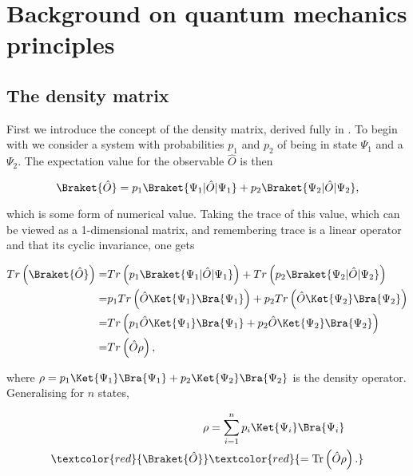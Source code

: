 \section{Background on quantum mechanics principles}
\subsection{The density matrix}
First we introduce  the concept of the density matrix,  derived fully in
\cite{quantum_course}.   To  begin  with   we  consider  a  system  with
probabilities  $p_1$  and  $p_2$  of  being  in  state  $\Psi_1$  and  a
$\Psi_2$. The expectation value for the observable $\hat{O}$ is then

\begin{equation}
  \Braket{\hat{O}} = p_1\Braket{\Psi_1|\hat{O}|\Psi_1} + p_2\Braket{\Psi_2|\hat{O}|\Psi_2},
\end{equation}

\noindent which  is some form  of numerical  value. Taking the  trace of
this  value,  which  can  be  viewed  as  a  1-dimensional  matrix,  and
remembering trace is  a linear operator and that  its cyclic invariance,
one gets

\begin{equation}
  \begin{aligned}
    Tr\left( \Braket{\hat{O}}\right)  = & Tr\left( p_1\Braket{\Psi_1|\hat{O}|\Psi_1}\right)  + Tr\left( p_2\Braket{\Psi_2|\hat{O}|\Psi_2}\right)  \\
    = & p_1Tr\left( \hat{O}\Ket{\Psi_1}\Bra{\Psi_1}\right)  + p_2Tr\left( \hat{O}\Ket{\Psi_2}\Bra{\Psi_2}\right) \\
    = & Tr\left(p_1\hat{O}\Ket{\Psi_1}\Bra{\Psi_1} + p_2 \hat{O}\Ket{\Psi_2}\Bra{\Psi_2}\right) \\
    = & Tr\left( \hat{O}\rho \right),
  \end{aligned}
\end{equation}

\noindent                                                          where
$\rho  = p_1\Ket{\Psi_1}\Bra{\Psi_1}  + p_2\Ket{\Psi_2}\Bra{\Psi_2}$  is
the density operator. Generalising for $n$ states,

\textcolor{red}{\begin{equation}
    \begin{aligned}
      \rho & = \sum_{i=1}^{n} p_i\Ket{\Psi_i}\Bra{\Psi_i}\\
      \textcolor{red}{\Braket{\hat{O}}}        &       \textcolor{red}{=
        \text{Tr}\left( \hat{O}\rho\right).}
    \end{aligned}
    \label{eqn:rawDensity}
  \end{equation}}


